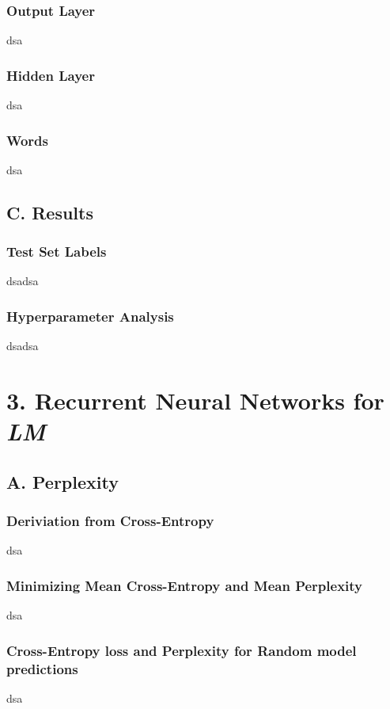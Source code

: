 \documentclass{article}
\begin{document}
\subsubsection*{Output Layer}
dsa

\subsubsection*{Hidden Layer}
dsa

\subsubsection*{Words}
dsa


\subsection*{C. Results}
\subsubsection*{Test Set Labels}
dsadsa

\subsubsection*{Hyperparameter Analysis}
dsadsa



\section*{3. Recurrent Neural Networks for \emph{LM}}
\subsection*{A. Perplexity}
\subsubsection*{Deriviation from Cross-Entropy}
dsa

\subsubsection*{Minimizing Mean Cross-Entropy and Mean Perplexity}
dsa

\subsubsection*{Cross-Entropy loss and Perplexity for \textbf{Random} model predictions}
dsa
\end{document}
